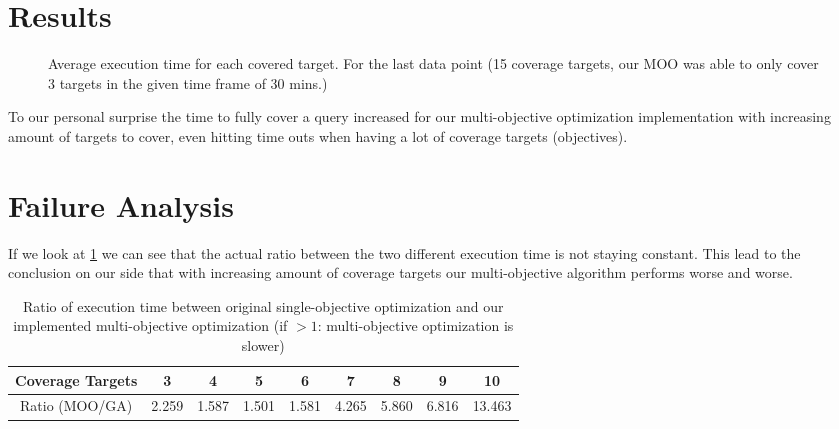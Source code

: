 \section{Results}
\label{sec:results}

\begin{figure}
	\centering
	\caption{Average execution time for each covered target. For the last data point (15 coverage targets, our MOO was able to only cover 3 targets in the given time frame of 30 mins.)}
	\label{fig:execution_time_results}
\end{figure}

To our personal surprise the time to fully cover a query increased for our multi-objective optimization implementation with increasing amount of targets to cover, even hitting time outs when having a lot of coverage targets (objectives).

\section{Failure Analysis}

If we look at \cref{tbl:ratio_coverage_targets} we can see that the actual ratio between the two different execution time is not staying constant. This lead to the conclusion on our side that with increasing amount of coverage targets our multi-objective algorithm performs worse and worse.

\begin{table}
	\centering
	\caption{Ratio of execution time between original single-objective optimization and our implemented multi-objective optimization (if $>1$: multi-objective optimization is slower)}
	\begin{tabular}{c|c|c|c|c|c|c|c|c}
		Coverage Targets & 3 & 4 & 5 & 6 & 7 & 8 & 9 & 10 \\ 
		\hline
		Ratio (MOO/GA) & 2.259 & 1.587 & 1.501 & 1.581 & 4.265 & 5.860 & 6.816 & 13.463
	\end{tabular} 
	\label{tbl:ratio_coverage_targets}
\end{table}

